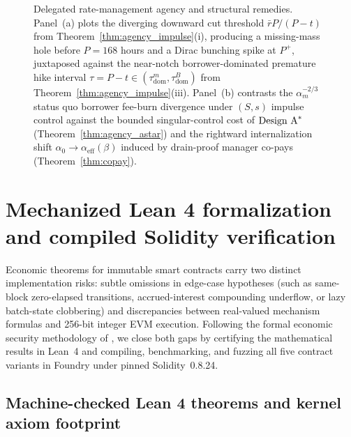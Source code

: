 \begin{figure}[t]
\caption{Delegated rate-management agency and structural remedies. Panel~(a) plots the diverging downward cut threshold $\bar{r}P/(P-t)$ from Theorem~\ref{thm:agency_impulse}(i), producing a missing-mass hole before $P = 168$ hours and a Dirac bunching spike at $P^+$, juxtaposed against the near-notch borrower-dominated premature hike interval $\tau = P - t \in (\tau_{\mathrm{dom}}^m, \tau_{\mathrm{dom}}^B)$ from Theorem~\ref{thm:agency_impulse}(iii). Panel~(b) contrasts the $\alpha_m^{-2/3}$ status quo borrower fee-burn divergence under $(S,s)$ impulse control against the bounded singular-control cost of $\textup{Design A}^*$ (Theorem~\ref{thm:agency_astar}) and the rightward internalization shift $\alpha_0 \to \alpha_{\mathrm{eff}}(\beta)$ induced by drain-proof manager co-pays (Theorem~\ref{thm:copay}).}
\label{fig:agency}
\end{figure}

\section{Mechanized Lean 4 formalization and compiled Solidity verification}\label{sec:verification}

Economic theorems for immutable smart contracts carry two distinct implementation risks: subtle omissions in edge-case hypotheses (such as same-block zero-elapsed transitions, accrued-interest compounding underflow, or lazy batch-state clobbering) and discrepancies between real-valued mechanism formulas and 256-bit integer EVM execution. Following the formal economic security methodology of \citet{bartoletti2025lean,bartoletti2026comp}, we close both gaps by certifying the mathematical results in Lean~4 and compiling, benchmarking, and fuzzing all five contract variants in Foundry under pinned Solidity~0.8.24.

\subsection{Machine-checked Lean 4 theorems and kernel axiom footprint}\label{subsec:lean}

